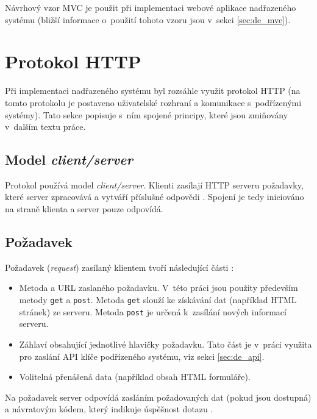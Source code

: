 Návrhový vzor MVC je použit při implementaci webové aplikace nadřazeného systému (bližší informace o~použití tohoto vzoru jsou v~sekci \ref{sec:de_mvc}).

\section{Protokol HTTP}

Při implementaci nadřazeného systému byl rozsáhle využit protokol HTTP (na tomto protokolu je postaveno uživatelské rozhraní a komunikace s~podřízenými systémy). Tato sekce popisuje s~ním spojené principy, které jsou zmiňovány v~dalším textu práce. 

\subsection{Model \textit{client/server}}

Protokol používá model \textit{client/server}. Klienti zasílají HTTP serveru požadavky, které server zpracovává a vytváří příslušné odpovědi \cite{tcp}. Spojení je tedy iniciováno na straně klienta a server pouze odpovídá. 

\subsection{Požadavek}

Požadavek (\textit{request}) zasílaný klientem tvoří následující části \cite{tcp}:

\begin{itemize}
    \item Metoda a URL zaslaného požadavku. V~této práci jsou použity především metody \texttt{get} a \texttt{post}. Metoda \texttt{get} slouží ke získávání dat (například HTML stránek) ze serveru. Metoda \texttt{post} je určená k~zasílání nových informací serveru.
    \item Záhlaví obsahující jednotlivé hlavičky požadavku. Tato část je v~práci využita pro zaslání API klíče podřízeného systému, viz sekci \ref{sec:de_api}.
    \item Volitelná přenášená data (například obsah HTML formuláře).
\end{itemize}

Na požadavek server odpovídá zasláním požadovaných dat (pokud jsou dostupná) a návratovým kódem, který indikuje úspěšnost dotazu \cite{tcp}.



